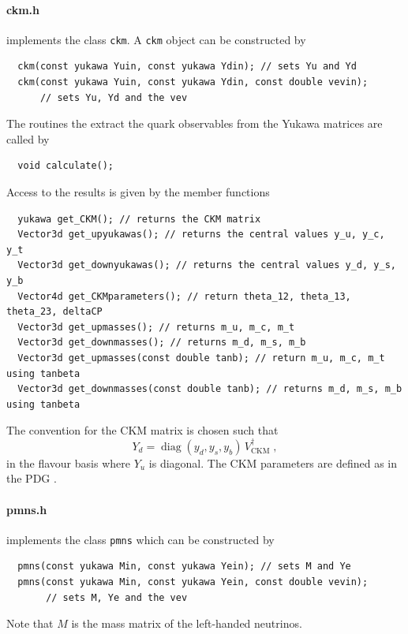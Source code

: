\documentclass[11pt,a4paper]{article}
\begin{document}
\paragraph{ckm.h}
implements the class \texttt{ckm}.
A \texttt{ckm} object can be constructed by
\begin{lstlisting}
  ckm(const yukawa Yuin, const yukawa Ydin); // sets Yu and Yd
  ckm(const yukawa Yuin, const yukawa Ydin, const double vevin);
      // sets Yu, Yd and the vev
\end{lstlisting}
The routines the extract the quark observables from the Yukawa matrices are called by
\begin{lstlisting}
  void calculate();
\end{lstlisting}
Access to the results is given by the member functions
\begin{lstlisting}
  yukawa get_CKM(); // returns the CKM matrix
  Vector3d get_upyukawas(); // returns the central values y_u, y_c, y_t
  Vector3d get_downyukawas(); // returns the central values y_d, y_s, y_b
  Vector4d get_CKMparameters(); // return theta_12, theta_13, theta_23, deltaCP
  Vector3d get_upmasses(); // returns m_u, m_c, m_t
  Vector3d get_downmasses(); // returns m_d, m_s, m_b
  Vector3d get_upmasses(const double tanb); // return m_u, m_c, m_t using tanbeta
  Vector3d get_downmasses(const double tanb); // returns m_d, m_s, m_b using tanbeta
\end{lstlisting}
The convention for the CKM matrix is chosen such that
\begin{equation}
  Y_d = \operatorname{diag}(y_d,y_s,y_b)\, V_{\mathrm{CKM}}^\dagger\;,
\end{equation}
in the flavour basis where $Y_u$ is diagonal. The CKM parameters are defined as in the PDG \cite{Patrignani:2016xqp}.

\paragraph{pmns.h}
implements the class \texttt{pmns} which can be constructed by
\begin{lstlisting}
  pmns(const yukawa Min, const yukawa Yein); // sets M and Ye
  pmns(const yukawa Min, const yukawa Yein, const double vevin);
       // sets M, Ye and the vev
\end{lstlisting}
Note that $M$ is the mass matrix of the left-handed neutrinos.
\end{document}
